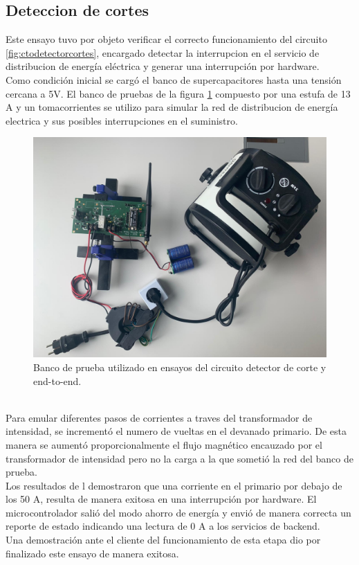 \vspace{200px}
\subsection{Deteccion de cortes}
Este ensayo tuvo por objeto verificar el correcto funcionamiento del circuito \ref{fig:ctodetectorcortes}, encargado detectar la interrupcion en el servicio de distribucion de energía el\'{e}ctrica y generar una interrupci\'{o}n por hardware.\\
Como condici\'{o}n inicial se carg\'{o} el banco de supercapacitores hasta una tensión cercana a 5V. 
El banco de pruebas de la figura \ref{fig:bancopruebae2e2} compuesto por una estufa de 13 A y un tomacorrientes se utilizo para simular la red de distribucion de energía electrica y sus posibles interrupciones en el suministro.\\
\begin{figure}[h]
	\centering
	\includegraphics[width=1.0\linewidth]{Figures/banco_prueba_e2e_1}
	\caption{Banco de prueba utilizado en ensayos del circuito detector de corte y end-to-end.}
	\label{fig:bancopruebae2e2}
\end{figure}\\
Para emular diferentes pasos de corrientes a traves del transformador de intensidad, se increment\'{o} el numero de vueltas en el devanado primario. De esta manera se aument\'{o} proporcionalmente el flujo magn\'{e}tico encauzado por el transformador de intensidad pero no la carga a la que someti\'{o} la red del banco de prueba.\\
Los resultados de l demostraron que una corriente en el primario por debajo de los 50 A, resulta de manera exitosa en una interrupci\'{o}n por hardware. El microcontrolador sali\'{o} del modo ahorro de energía y envi\'{o} de manera correcta un reporte de estado indicando una lectura de 0 A a los servicios de backend.\\
Una demostraci\'{o}n ante el cliente del funcionamiento de esta etapa dio por finalizado este ensayo de manera exitosa.\\

